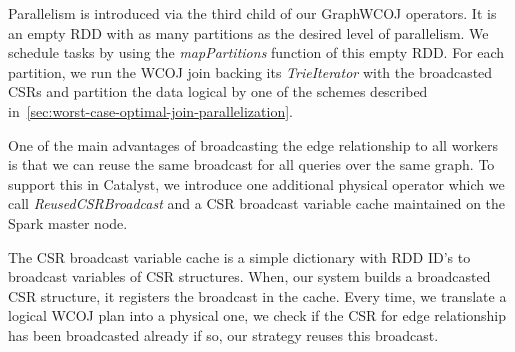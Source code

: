 Parallelism is introduced via the third child of our GraphWCOJ operators.
It is an empty RDD with as many partitions as the desired level of parallelism.
We schedule tasks by using the \textit{mapPartitions} function of this empty RDD.
For each partition, we run the \textsc{WCOJ} join backing its \textit{TrieIterator} with the broadcasted CSRs and partition the data
logical by one of the schemes described in~\cref{sec:worst-case-optimal-join-parallelization}.

One of the main advantages of broadcasting the edge relationship to all workers is that we can reuse the same broadcast for all queries
over the same graph.
To support this in Catalyst, we introduce one additional physical operator which we call \textit{ReusedCSRBroadcast} and a CSR broadcast
variable cache maintained on the Spark master node.

The CSR broadcast variable cache is a simple dictionary with RDD ID's to broadcast variables of CSR structures.
When, our system builds a broadcasted CSR structure, it registers the broadcast in the cache.
Every time, we translate a logical \textsc{WCOJ} plan into a physical one, we check if the CSR for edge relationship has been broadcasted already
if so, our strategy reuses this broadcast.



